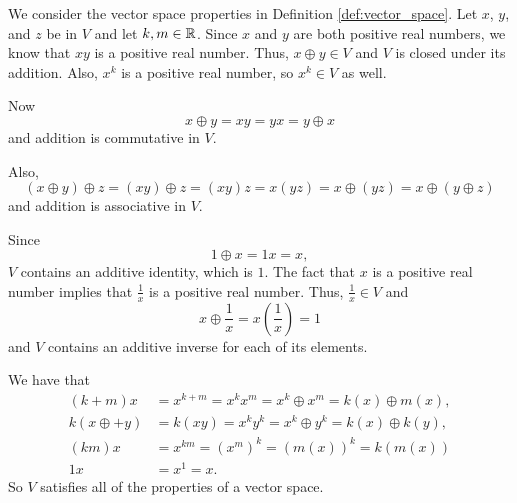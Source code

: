 \begin{example}
	
	
	

	\item We consider the vector space properties in Definition \ref{def:vector_space}. Let $x$, $y$, and $z$ be in $V$ and let $k,m  \in \mathbb{R}$. Since $x$ and $y$ are both positive real numbers, we know that $xy$ is a positive real number. Thus, $x \oplus y \in V$ and $V$ is closed under its addition. Also, $x^k$ is a positive real number, so $x^k \in V$ as well. 

Now
	\[x \oplus y = xy = yx = y \oplus x\]
	and addition is commutative in $V$.  
	
Also,
\[(x \oplus y) \oplus z = (xy) \oplus z = (xy)z = x(yz) = x \oplus (yz) = x \oplus (y \oplus z)\]
and addition is associative in $V$. 

Since 
\[1 \oplus x = 1x = x,\]
$V$ contains an additive identity, which is $1$.  The fact that $x$ is a positive real number implies that $\frac{1}{x}$ is a positive real number. Thus, $\frac{1}{x} \in V$ and
\[x \oplus \frac{1}{x} = x\left(\frac{1}{x}\right) = 1\]
and $V$ contains an additive inverse for each of its elements. 

We have that 
\begin{align*}
(k+m)x &= x^{k+m} = x^kx^m = x^k \oplus x^m = k(x) \oplus m(x), \\
k(x \oplus +y) &= k(xy) = x^ky^k = x^k \oplus y^k = k(x) \oplus k(y), \\
(km)x &= x^{km} = \left(x^m\right)^k = (m(x))^k = k(m(x)) \\
1x &= x^1 = x.
\end{align*}
So $V$ satisfies all of the properties of a vector space. 


\end{example}
